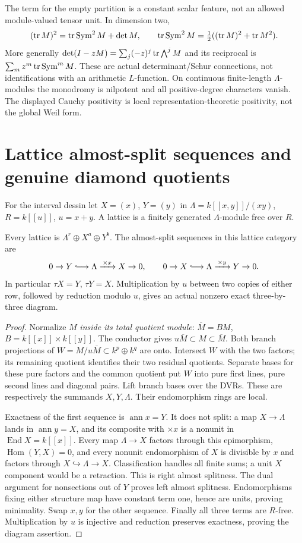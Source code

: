 The term for the empty partition is a constant scalar feature, not an allowed module-valued tensor unit. In dimension two,
\[
 (\operatorname{tr} M)^2=\operatorname{tr}\operatorname{Sym}^2M+\det M,\qquad
 \operatorname{tr}\operatorname{Sym}^2M=\tfrac12((\operatorname{tr} M)^2+\operatorname{tr} M^2).
\]
More generally $\det(I-zM)=\sum_j(-z)^j\operatorname{tr}\bigwedge^jM$ and its reciprocal is $\sum_m z^m\operatorname{tr}\operatorname{Sym}^mM$. These are actual determinant/Schur connections, not identifications with an arithmetic $L$-function. On continuous finite-length $\Lambda$-modules the monodromy is nilpotent and all positive-degree characters vanish. The displayed Cauchy positivity is local representation-theoretic positivity, not the global Weil form.


\chapter{Lattice almost-split sequences and genuine diamond quotients}
For the interval dessin let $X=(x)$, $Y=(y)$ in $\Lambda=k[[x,y]]/(xy)$, $R=k[[u]]$, $u=x+y$. A lattice is a finitely generated $\Lambda$-module free over $R$.
\begin{theorem}\label{thm:nodear}
Every lattice is $\Lambda^r\oplus X^a\oplus Y^b$. The almost-split sequences in this lattice category are
\[
 0\to Y\lhook\joinrel\longrightarrow\Lambda\xrightarrow{\,\times x\,}X\to0,
 \qquad0\to X\lhook\joinrel\longrightarrow\Lambda\xrightarrow{\,\times y\,}Y\to0.
\]
In particular $\tau X=Y$, $\tau Y=X$. Multiplication by $u$ between two copies of either row, followed by reduction modulo $u$, gives an actual nonzero exact three-by-three diagram.
\end{theorem}
\begin{proof}
Normalize $M$ \emph{inside its total quotient module}: $\overline M=BM$, $B=k[[x]]\times k[[y]]$. The conductor gives $u\overline M\subset M\subset\overline M$. Both branch projections of $W=M/u\overline M\subset k^p\oplus k^q$ are onto. Intersect $W$ with the two factors; its remaining quotient identifies their two residual quotients. Separate bases for these pure factors and the common quotient put $W$ into pure first lines, pure second lines and diagonal pairs. Lift branch bases over the DVRs. These are respectively the summands $X,Y,\Lambda$. Their endomorphism rings are local.

Exactness of the first sequence is $\operatorname{ann}x=Y$. It does not split: a map $X\to\Lambda$ lands in $\operatorname{ann}y=X$, and its composite with $\times x$ is a nonunit in $\operatorname{End}X=k[[x]]$. Every map $\Lambda\to X$ factors through this epimorphism, $\operatorname{Hom}(Y,X)=0$, and every nonunit endomorphism of $X$ is divisible by $x$ and factors through $X\hookrightarrow\Lambda\to X$. Classification handles all finite sums; a unit $X$ component would be a retraction. This is right almost splitness. The dual argument for nonsections out of $Y$ proves left almost splitness. Endomorphisms fixing either structure map have constant term one, hence are units, proving minimality. Swap $x,y$ for the other sequence. Finally all three terms are $R$-free. Multiplication by $u$ is injective and reduction preserves exactness, proving the diagram assertion.
\end{proof}
